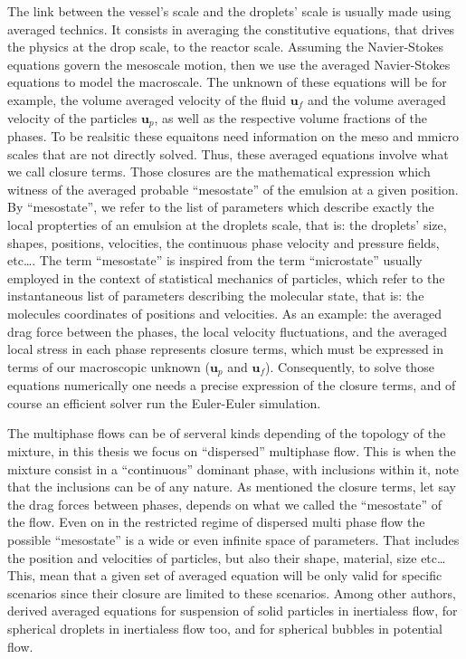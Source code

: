 The link between the vessel's scale and the droplets' scale is usually made using averaged technics. 
It consists in averaging the constitutive equations, that drives the physics at the drop scale, to the reactor scale. 
Assuming the Navier-Stokes equations govern the mesoscale motion, then 
we use the averaged Navier-Stokes equations \citep{jackson1997locally} to model the macroscale. 
The unknown of these equations will be for example, the volume averaged velocity of the fluid $\textbf{u}_f$ and the volume averaged velocity of the particles $\textbf{u}_p$, as well as the respective volume fractions of the phases. 
To be realsitic these equaitons need information on the meso and mmicro scales that are not directly solved. 
Thus, these averaged equations involve what we call closure terms.
Those closures are the mathematical expression which witness of the averaged probable ``mesostate'' of the emulsion at a given position. 
By ``mesostate'', we refer to the list of parameters which describe exactly the local propterties of an emulsion at the droplets scale, that is: the droplets' size, shapes, positions, velocities, the continuous phase velocity and pressure fields, etc\ldots. 
The term ``mesostate'' is inspired from the term ``microstate'' usually employed in the context of statistical mechanics of particles, which refer to the instantaneous list of parameters describing the molecular state, that is: the molecules coordinates of positions and velocities. 
As an example: the averaged drag force between the phases, the local velocity fluctuations, and the averaged local stress in each phase represents closure terms, which must be expressed in terms of our macroscopic unknown ($\textbf{u}_p$ and $\textbf{u}_f$). 
Consequently, to solve those equations numerically one needs a precise expression of the closure terms, and of course an efficient solver run the Euler-Euler simulation. 

The multiphase flows can be of serveral kinds depending of the topology of the mixture, in this thesis we focus on ``dispersed'' multiphase flow. 
This is when the mixture consist in a ``continuous'' dominant phase, with inclusions within it, note that the inclusions can be of any nature. 
As mentioned the closure terms, let say the drag forces between phases, depends on what we called the ``mesostate'' of the flow. 
Even on in the restricted regime of dispersed multi phase flow the possible ``mesostate'' is a wide or even infinite space of parameters. 
That includes the position and velocities of particles, but also their shape, material, size etc\ldots
This, mean that a given set of averaged equation will be only valid for specific scenarios since their closure are limited to these scenarios. 
Among other authors, \citet{jackson1997locally} derived  averaged equations for suspension of solid particles in inertialess flow, \citet{zhang1997momentum} for spherical droplets in inertialess flow too, and \citet{zhang1994averaged} for spherical bubbles in potential flow.



